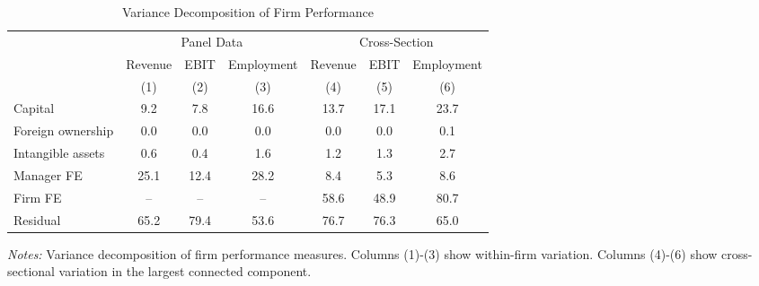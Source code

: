 \begin{table}[htbp]
\centering
\caption{Variance Decomposition of Firm Performance}
\label{tab:variance_decomposition}
\begin{tabular}{l*{6}{c}}
\toprule
 & \multicolumn{3}{c}{Panel Data} & \multicolumn{3}{c}{Cross-Section} \\
\cmidrule(lr){2-4} \cmidrule(lr){5-7}
 & Revenue & EBIT & Employment & Revenue & EBIT & Employment \\
 & (1) & (2) & (3) & (4) & (5) & (6) \\
\midrule
Capital &   9.2 &   7.8 &  16.6 &  13.7 &  17.1 &  23.7 \\
Foreign ownership &   0.0 &   0.0 &   0.0 &   0.0 &   0.0 &   0.1 \\
Intangible assets &   0.6 &   0.4 &   1.6 &   1.2 &   1.3 &   2.7 \\
Manager FE &  25.1 &  12.4 &  28.2 &   8.4 &   5.3 &   8.6 \\
Firm FE & -- & -- & -- &  58.6 &  48.9 &  80.7 \\
Residual &  65.2 &  79.4 &  53.6 &  76.7 &  76.3 &  65.0 \\
\bottomrule
\end{tabular}
\begin{minipage}{14cm}
\footnotesize
\textit{Notes:} Variance decomposition of firm performance measures. Columns (1)-(3) show within-firm variation. Columns (4)-(6) show cross-sectional variation in the largest connected component. \end{minipage}
\end{table}
